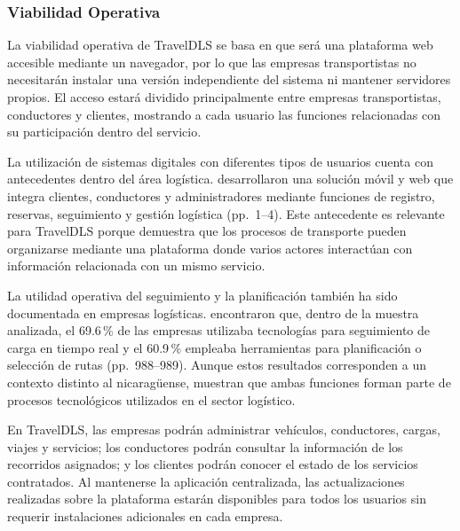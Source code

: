 \subsubsection{Viabilidad Operativa}
\label{sec:viabilidad-operativa}

La viabilidad operativa de TravelDLS se basa en que será una plataforma web accesible mediante un navegador, por lo que las empresas transportistas no necesitarán instalar una versión independiente del sistema ni mantener servidores propios. El acceso estará dividido principalmente entre empresas transportistas, conductores y clientes, mostrando a cada usuario las funciones relacionadas con su participación dentro del servicio.

La utilización de sistemas digitales con diferentes tipos de usuarios cuenta con antecedentes dentro del área logística. \textcite{sultan2022real} desarrollaron una solución móvil y web que integra clientes, conductores y administradores mediante funciones de registro, reservas, seguimiento y gestión logística (pp.~1--4). Este antecedente es relevante para TravelDLS porque demuestra que los procesos de transporte pueden organizarse mediante una plataforma donde varios actores interactúan con información relacionada con un mismo servicio.

La utilidad operativa del seguimiento y la planificación también ha sido documentada en empresas logísticas. \textcite{pauzuoliene2024smart} encontraron que, dentro de la muestra analizada, el 69.6\,\% de las empresas utilizaba tecnologías para seguimiento de carga en tiempo real y el 60.9\,\% empleaba herramientas para planificación o selección de rutas (pp.~988--989). Aunque estos resultados corresponden a un contexto distinto al nicaragüense, muestran que ambas funciones forman parte de procesos tecnológicos utilizados en el sector logístico.

En TravelDLS, las empresas podrán administrar vehículos, conductores, cargas, viajes y servicios; los conductores podrán consultar la información de los recorridos asignados; y los clientes podrán conocer el estado de los servicios contratados. Al mantenerse la aplicación centralizada, las actualizaciones realizadas sobre la plataforma estarán disponibles para todos los usuarios sin requerir instalaciones adicionales en cada empresa.

